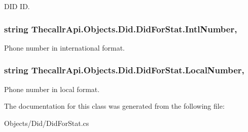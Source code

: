 D\+I\+D I\+D. 

\hypertarget{class_thecallr_api_1_1_objects_1_1_did_1_1_did_for_stat_af122d6765d9204d750df5099eb8891e6}{
\subsubsection[{Intl\+Number}]{\setlength{\rightskip}{0pt plus 5cm}string Thecallr\+Api.\+Objects.\+Did.\+Did\+For\+Stat.\+Intl\+Number\hspace{0.3cm}{\ttfamily [get]}, {\ttfamily [set]}}}\label{class_thecallr_api_1_1_objects_1_1_did_1_1_did_for_stat_af122d6765d9204d750df5099eb8891e6}


Phone number in international format. 

\hypertarget{class_thecallr_api_1_1_objects_1_1_did_1_1_did_for_stat_a2f40a26d299bc9950802443410c90bba}{
\subsubsection[{Local\+Number}]{\setlength{\rightskip}{0pt plus 5cm}string Thecallr\+Api.\+Objects.\+Did.\+Did\+For\+Stat.\+Local\+Number\hspace{0.3cm}{\ttfamily [get]}, {\ttfamily [set]}}}\label{class_thecallr_api_1_1_objects_1_1_did_1_1_did_for_stat_a2f40a26d299bc9950802443410c90bba}


Phone number in local format. 



The documentation for this class was generated from the following file\+:\begin{DoxyCompactItemize}
\item 
Objects/\+Did/Did\+For\+Stat.\+cs\end{DoxyCompactItemize}
